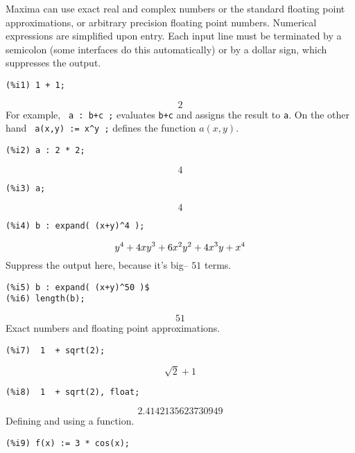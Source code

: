 \documentclass[leqno]{article}
\newcommand{\isqrt}[1]{\sqrt{#1}}
\begin{document}
Maxima can use exact real and complex numbers or the
standard floating point approximations, or arbitrary
precision floating point numbers.  Numerical expressions are
simplified upon entry. Each input line must be terminated by
a semicolon (some interfaces do this automatically) or by a
dollar sign, which suppresses the output.
\begin{verbatim}
(%i1) 1 + 1;
\end{verbatim}
\begin{dmath}[number={\%o1}]
  2\end{dmath} 
For example, \verb| a : b+c ;| evaluates \verb|b+c| and assigns the result to \verb|a|.
On the other hand \verb| a(x,y) := x^y ;| defines the function $a(x,y)$.
\begin{verbatim}
(%i2) a : 2 * 2;
\end{verbatim}
\begin{dmath}[number={\%o2}]
 4\end{dmath}
\begin{verbatim}
(%i3) a;
\end{verbatim}
\begin{dmath}[number={\%o3}]
 4\end{dmath}
\begin{verbatim}
(%i4) b : expand( (x+y)^4 );
\end{verbatim}
\begin{dmath}[number={\%o4}]
 y^{4}+4\*x\*y^{3}+6\*x^{2}\*y^{2}+4\*x^{3}\*y+x^{4}\end{dmath}
 Suppress the output here, because it's big-- $51$ terms.
\begin{verbatim}
(%i5) b : expand( (x+y)^50 )$
(%i6) length(b);
\end{verbatim}
\begin{dmath}[number={\%o6}]
 51\end{dmath}
Exact numbers and floating point approximations.
\begin{verbatim}
(%i7)  1  + sqrt(2);
\end{verbatim}
\begin{dmath}[number={\%o7}]
 \isqrt{2}+1\end{dmath}
\begin{verbatim}
(%i8)  1  + sqrt(2), float;
\end{verbatim}
\begin{dmath}[number={\%o8}]
 2.4142135623730949\end{dmath}
Defining and using a function.
\begin{verbatim}
(%i9) f(x) := 3 * cos(x);
\end{verbatim}
\end{document}
